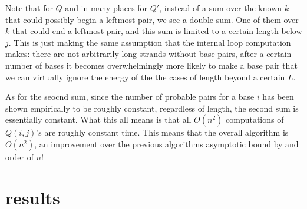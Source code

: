 Note that for $Q$ and in many places for $Q'$, instead of a sum over
the known $k$ that could possibly begin a leftmost pair, we see a
double sum. One of them over $k$ that could end a leftmost pair, and
this sum is limited to a certain length below $j$. This is just making
the same assumption that the internal loop computation makes: there
are not arbitrarily long strands without base pairs, after a certain
number of bases it becomes overwhelmingly more likely to make a base
pair that we can virtually ignore the energy of the the cases of
length beyond a certain $L$.

As for the seocnd sum, since the number of probable pairs for a base
$i$ has been shown empirically to be roughly constant, regardless of
length, the second sum is essentially constant. What this all means is
that all $O(n^2)$ computations of $Q(i,j)$'s are roughly constant
time. This means that the overall algorithm is $O(n^2)$, an
improvement over the previous algorithms asymptotic bound by and order
of $n$!



\section{results}
